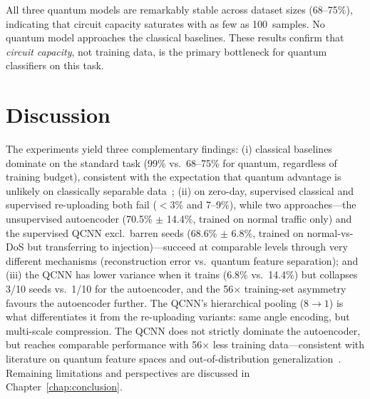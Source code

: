 All three quantum models are remarkably stable across dataset sizes (68--75\%), indicating that circuit capacity saturates with as few as 100~samples. No quantum model approaches the classical baselines. These results confirm that \emph{circuit capacity}, not training data, is the primary bottleneck for quantum classifiers on this task.

\section{Discussion}
\label{sec:res_discussion}

The experiments yield three complementary findings: (i) classical baselines dominate on the standard task (99\% vs.\ 68--75\% for quantum, regardless of training budget), consistent with the expectation that quantum advantage is unlikely on classically separable data~\cite{schuld2021effect, bowles2024better}; (ii) on zero-day, supervised classical and supervised re-uploading both fail ($<3\%$ and 7--9\%), while two approaches---the unsupervised autoencoder (70.5\% $\pm$ 14.4\%, trained on normal traffic only) and the supervised QCNN excl.\ barren seeds (68.6\% $\pm$ 6.8\%, trained on normal-vs-DoS but transferring to injection)---succeed at comparable levels through very different mechanisms (reconstruction error vs.\ quantum feature separation); and (iii) the QCNN has lower variance when it trains (6.8\% vs.\ 14.4\%) but collapses 3/10 seeds vs.\ 1/10 for the autoencoder, and the 56$\times$ training-set asymmetry favours the autoencoder further. The QCNN's hierarchical pooling ($8 \to 1$) is what differentiates it from the re-uploading variants: same angle encoding, but multi-scale compression. The QCNN does not strictly dominate the autoencoder, but reaches comparable performance with 56$\times$ less training data---consistent with literature on quantum feature spaces and out-of-distribution generalization~\cite{havlicek2019supervised, schuld2020circuit}. Remaining limitations and perspectives are discussed in Chapter~\ref{chap:conclusion}.
